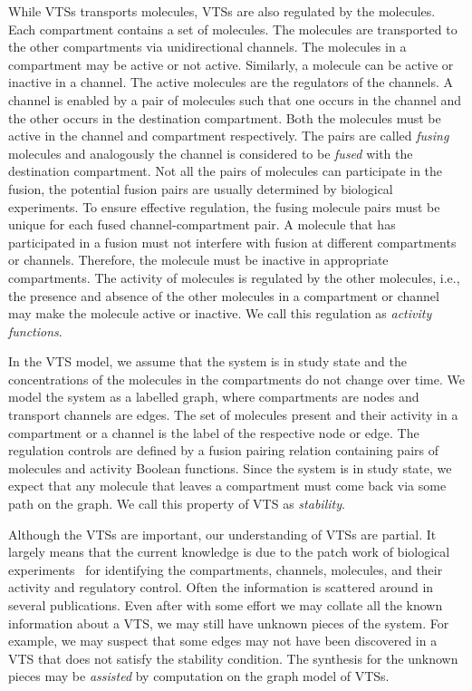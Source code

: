While VTSs transports molecules, VTSs are also
regulated by the molecules.
%
Each compartment contains a set of molecules.
%
The molecules are transported to the other compartments via
unidirectional channels.  
%
The molecules in a compartment may be active or not active.
%
Similarly, a molecule can be active or inactive in a channel. 
%
The active molecules are the regulators of the channels.
%
A channel is enabled by a pair of molecules
such that one occurs in the channel and the other
occurs in the destination compartment.
%
Both the molecules must be active in the channel
and compartment respectively.
%
The pairs are called {\em fusing} molecules and analogously
the channel is considered to be {\em fused} with the
destination compartment.
%
Not all the pairs of molecules can participate in the fusion, the
potential fusion pairs are usually determined by biological experiments.
%
To ensure effective regulation, the fusing molecule pairs must be
unique for each fused channel-compartment pair.
%
A molecule that has participated in a fusion must not interfere
with fusion at different compartments or channels.
%
Therefore, the molecule must be inactive in appropriate compartments.
%
The activity of molecules is regulated by the other molecules, i.e.,
the presence and absence of the other molecules in a compartment or
channel may make the molecule active or inactive.
%
We call this regulation as {\em activity functions}.

%
In the VTS model, we assume that the system is in study state and
the concentrations of the molecules in the compartments do not change over time.
%
We model the system as a labelled graph, where compartments are nodes and
transport channels are edges.
%
The set of molecules present and their activity in a compartment or
a channel is the label of the respective node or edge.
%
The regulation controls are defined by a fusion pairing relation
containing pairs of molecules and activity
Boolean functions.
%
Since the system is in study state, we expect that any molecule that
leaves a compartment must come back via some path on the graph.
%
We call this property of VTS as {\em stability}.

%
Although the VTSs are important, our understanding of VTSs are partial.
%
It largely means that the current knowledge is due to the patch work
of biological experiments~\cite{model} for identifying the compartments,
channels, molecules, and their activity and regulatory control.
%
Often the information is scattered around in several publications.
%
Even after with some effort we may collate all the known information about
a VTS, we may still have unknown pieces of the system.
%
%
For example, we may suspect that some edges may not have been
discovered in a VTS that does not satisfy the stability condition.
%
The synthesis for the unknown pieces may be {\em assisted} by computation on
the graph model of VTSs.
%

